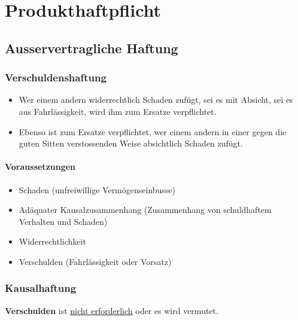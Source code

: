 \section{Produkthaftpflicht}

\subsection{Ausservertragliche Haftung}

\subsubsection{Verschuldenshaftung}
\begin{itemize}
    \item Wer einem andern widerrechtlich Schaden zufügt, sei es mit Absicht, sei es aus Fahrlässigkeit, wird ihm zum Ersatze verpflichtet.
    \item Ebenso ist zum Ersatze verpflichtet, wer einem andern in einer gegen die guten Sitten verstossenden Weise absichtlich Schaden zufügt.
\end{itemize}

\paragraph{Voraussetzungen}
\begin{minipage}{0.5\linewidth}
    \begin{itemize}
        \item Schaden (unfreiwillige Vermögenseinbusse)
        \item Adäquater Kausalzusammenhang (Zusammenhang von schuldhaftem Verhalten und Schaden)
    \end{itemize}
\end{minipage}
\begin{minipage}{0.5\linewidth}
    \begin{itemize}
        \item Widerrechtlichkeit
        \item Verschulden (Fahrlässigkeit oder Vorsatz)
    \end{itemize}
\end{minipage}

\subsubsection{Kausalhaftung}
\textbf{Verschulden} ist \underline{nicht erforderlich} oder es wird vermutet.

